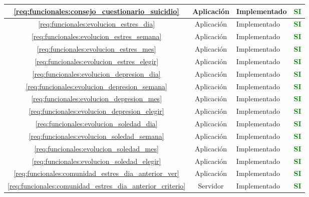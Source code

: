 \begin{xltabular}{\textwidth}{|c|c|X|c|}
        \hline
        \ref{req:funcionales:consejo_cuestionario_suicidio} & Aplicación & Implementado & \textcolor{green}{\textbf{SI}} \\
        \hline
        \ref{req:funcionales:evolucion_estres_dia} & Aplicación & Implementado & \textcolor{green}{\textbf{SI}} \\
        \hline
        \ref{req:funcionales:evolucion_estres_semana} & Aplicación & Implementado & \textcolor{green}{\textbf{SI}} \\
        \hline
        \ref{req:funcionales:evolucion_estres_mes} & Aplicación & Implementado & \textcolor{green}{\textbf{SI}} \\
        \hline
        \ref{req:funcionales:evolucion_estres_elegir} & Aplicación & Implementado & \textcolor{green}{\textbf{SI}} \\
        \hline
        \ref{req:funcionales:evolucion_depresion_dia} & Aplicación & Implementado & \textcolor{green}{\textbf{SI}} \\
        \hline
        \ref{req:funcionales:evolucion_depresion_semana} & Aplicación & Implementado & \textcolor{green}{\textbf{SI}} \\
        \hline
        \ref{req:funcionales:evolucion_depresion_mes} & Aplicación & Implementado & \textcolor{green}{\textbf{SI}} \\
        \hline
        \ref{req:funcionales:evolucion_depresion_elegir} & Aplicación & Implementado & \textcolor{green}{\textbf{SI}} \\
        \hline
        \ref{req:funcionales:evolucion_soledad_dia} & Aplicación & Implementado & \textcolor{green}{\textbf{SI}} \\
        \hline
        \ref{req:funcionales:evolucion_soledad_semana} & Aplicación & Implementado & \textcolor{green}{\textbf{SI}} \\
        \hline
        \ref{req:funcionales:evolucion_soledad_mes} & Aplicación & Implementado & \textcolor{green}{\textbf{SI}} \\
        \hline
        \ref{req:funcionales:evolucion_soledad_elegir} & Aplicación & Implementado & \textcolor{green}{\textbf{SI}} \\
        \hline
        \ref{req:funcionales:comunidad_estres_dia_anterior_ver} & Aplicación & Implementado & \textcolor{green}{\textbf{SI}} \\
        \hline
        \ref{req:funcionales:comunidad_estres_dia_anterior_criterio} & Servidor & Implementado & \textcolor{green}{\textbf{SI}} \\

\end{xltabular}
